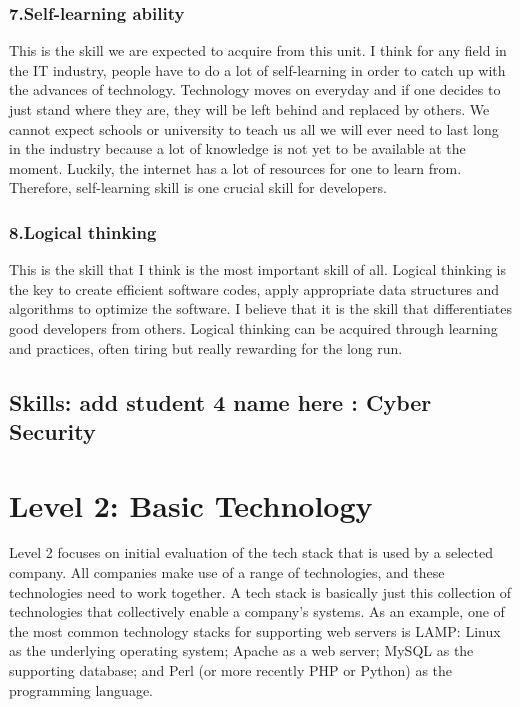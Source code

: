 \documentclass[a4paper, 11pt]{report}
\begin{document}
	\subsubsection{7.Self-learning ability}
	 This is the skill we are expected to acquire from this unit. I think for any field in the IT industry, people have to do a lot of self-learning in order to catch up with the advances of technology. Technology moves on everyday and if one decides to just stand where they are, they will be left behind and replaced by others. We cannot expect schools or university to teach us all we will ever need to last long in the industry  because a lot of knowledge is not yet to be available at the moment. Luckily, the internet has a lot of resources for one to learn from. Therefore, self-learning skill is one crucial skill for developers.
	\subsubsection{8.Logical thinking}
	 This is the skill that I think is the most important skill of all. Logical thinking is the key to create efficient software codes, apply appropriate data structures and algorithms to  optimize the software. I believe that it is the skill that differentiates good developers from others. Logical thinking can be acquired through learning and practices, often tiring but really rewarding for the long run. 
\subsection{Skills: add student 4 name here : Cyber Security}

\newpage
\section{Level 2: Basic Technology}

Level 2 focuses on initial evaluation of the tech stack that is used by a selected company. All companies make use of a range of technologies, and these technologies need to work together. A tech stack is basically just this collection of technologies that collectively enable a company's systems. As an example, one of the most common technology stacks for supporting web servers is LAMP: Linux as the underlying operating system; Apache as a web server; MySQL as the supporting database; and Perl (or more recently PHP or Python) as the programming language.
\end{document}
